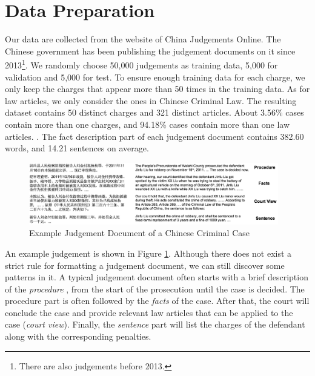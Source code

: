 \section{Data Preparation} 
Our data are collected from the website of China Judgements Online. The Chinese government has been publishing the judgement documents on it since 2013\footnote{There are also judgements before 2013.}. We randomly choose 50,000 judgements as training data, 5,000 for validation and 5,000 for test. To ensure enough training data for each charge, we only keep the charges that appear more than 50 times in the training data. As for law articles, we only consider the ones in Chinese Criminal Law. The resulting dataset contains 50 distinct charges and 321 distinct articles. About 3.56\% cases contain more than one charges, and 94.18\% cases contain more than one law articles. . The fact description part of each judgement document contains 382.60 words, and 14.21 sentences on average.

\begin{figure}[t!]
\begin{center}
\includegraphics[width=0.97\textwidth]{figures/case.png}	
\caption{Example Judgement Document of a Chinese Criminal Case}
\label{fig_example_case}
\end{center}
\end{figure}

An example judgement is shown in Figure \ref{fig_example_case}. Although there does not exist a strict rule for formatting a judgement document, we can still discover some patterns in it. A typical judgement document often starts with a brief description of the \emph{procedure} , from the start of the prosecution until the case is decided. The procedure part is often followed by the \emph{facts} of the case. After that, the court will conclude the case and provide relevant law articles that can be applied to the case (\emph{court view}). Finally, the \emph{sentence} part will list the charges of the defendant along with the corresponding penalties. 

